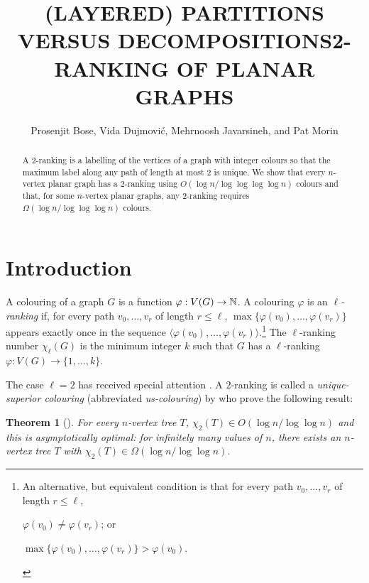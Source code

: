 \documentclass[kpfonts]{patmorin}
\title{\MakeUppercase{(Layered) Partitions versus Decompositions}}
\author{}
\title{\MakeUppercase{2-Ranking of Planar Graphs}}
\author{Prosenjit Bose, Vida Dujmović, Mehrnoosh Javarsineh, and Pat Morin}
\newcommand{\uqs}{\chi_2}
\newtheorem{othertheorem}{Theorem}
\begin{document}
\begin{titlepage}
\maketitle

\begin{abstract}
  A 2-ranking is a labelling of the vertices of a graph with integer colours so that the maximum label along any path of length at most 2 is unique.  We show that every $n$-vertex planar graph has a 2-ranking using $O(\log n/\log\log\log\log n)$ colours and that, for some $n$-vertex planar graphs, any 2-ranking requires $\Omega(\log n/\log\log\log n)$ colours.
\end{abstract}
\end{titlepage}

\tableofcontents

\newpage
{}

\section{Introduction}


A colouring of a graph $G$ is a function $\varphi:V(G)\to \mathbb{N}$.  A colouring $\varphi$ is an \emph{$\ell$-ranking} if, for every path $v_0,\ldots,v_r$ of length $r\le\ell$, $\max\{\varphi(v_0),\ldots,\varphi(v_r)\}$ appears exactly once in the sequence $\langle \varphi(v_0),\ldots,\varphi(v_r)\rangle$.\footnote{An alternative, but equivalent condition is that for every path $v_0,\ldots,v_r$ of length $r\le\ell$,
\begin{inparaenum}[(i)]
   \item $\varphi(v_0)\neq \varphi(v_r)$; or
   \item $\max\{\varphi(v_0),\ldots,\varphi(v_r)\} > \varphi(v_0)$.
\end{inparaenum}
}
The $\ell$-ranking number $\chi_\ell(G)$ is the minimum integer $k$ such that $G$ has a $\ell$-ranking $\varphi:V(G)\to \{1,\ldots,k\}$.

The case $\ell=2$ has received special attention \cite{almeter.demircan.ea:graph,karpas.neiman.ea:on}. A $2$-ranking is called a \emph{unique-superior colouring} (abbreviated \emph{us-colouring}) by \citet{karpas.neiman.ea:on} who prove the following result:

\setcounter{othertheorem}{19}
\begin{othertheorem}[\cite{karpas.neiman.ea:on}]\label{trees}
    For every $n$-vertex tree $T$, $\uqs(T)\in O(\log n/\log\log n)$ and this is asymptotically optimal: for infinitely many values of $n$, there exists an $n$-vertex tree $T$ with $\uqs(T)\in\Omega(\log n/\log\log n)$.
\end{othertheorem}
\end{document}
